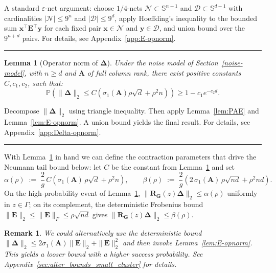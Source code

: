 \documentclass{article}
\newcommand{\twonorm}[1]{\|#1\|_2}
\newcommand{\pr}[1]{\mbox{}\mathbb{P}\left(#1\right)}
\newcommand{\ts}{\top}
\newcommand{\xb}{\mathbf{x}}
\newcommand{\yb}{\mathbf{y}}
\newcommand{\Ab}{\mathbf{A}}
\newcommand{\Eb}{\mathbf{E}}
\newcommand{\Gb}{\mathbf{G}}
\newcommand{\Rb}{\mathbf{R}}
\newcommand{\Dcal}{\mathcal{D}}
\newcommand{\Ncal}{\mathcal{N}}
\newcommand{\BlackBox}{\rule{1.5ex}{1.5ex}}  %
\newenvironment{proof}{\par\noindent{\bf Proof\ }}{\hfill\BlackBox\par\medskip}
\newtheorem{lemma}{Lemma}[section]
\newtheorem{remark}[theorem]{Remark}
\newcommand{\rbr}[1]{\left(#1\right)}
\newcommand{\Deltab}{\boldsymbol{\Delta}}
\begin{document}
\begin{proof}
    A standard $\varepsilon$-net argument: choose $1/4$-nets $\Ncal \subset \mathbb{S}^{n-1}$ and $\Dcal \subset \mathbb{S}^{d-1}$ with cardinalities $|\Ncal|\le 9^n$ and $|\Dcal|\le 9^d$, apply Hoeffding's inequality to the bounded sum $\xb^\ts \Eb^\ts \yb$ for each fixed pair $\xb\in \Ncal$ and $\yb\in \Dcal$, and union bound over the $9^{n+d}$ pairs. 
   For details, see Appendix~\ref{app:E-opnorm}.
\end{proof}

\begin{lemma}[Operator norm of $\Deltab$]\label{lem:Delta-opnorm}
Under the noise model of Section~\ref{noise-model}, with $n \ge d$ and $\Ab$ of full column rank, there exist positive constants $C, c_1, c_2$, such that:
\begin{equation*}
    \pr{\twonorm{\Deltab} \le C (\sigma_1(\Ab) \rho \sqrt{d} + \rho^2 n)} \ge 1 - c_1 e^{-c_2 d}.
\end{equation*}
\end{lemma}

\begin{proof}
Decompose $\twonorm{\Deltab}$ using triangle inequality. Then apply Lemma~\ref{lem:PAE} and Lemma~\ref{lem:E-opnorm}. A union bound yields the final result. For details, see Appendix~\ref{app:Delta-opnorm}.
\end{proof}

With Lemma~\ref{lem:Delta-opnorm} in hand we can define the contraction parameters that drive the Neumann tail bound below: let $C$ be the constant from Lemma~\ref{lem:Delta-opnorm} and set
\begin{equation}\label{eq:alpha-beta}
    \alpha(\rho) \;:=\; \frac{2}{g}\,C\rbr{\sigma_1(\Ab)\,\rho\sqrt{d} + \rho^2 n},
    \qquad
    \beta(\rho) \;:=\; \frac{2}{g}\rbr{2\,\sigma_1(\Ab)\,\rho\sqrt{nd} + \rho^2 nd}.
\end{equation}
On the high-probability event of Lemma~\ref{lem:Delta-opnorm}, $\twonorm{\Rb_\Gb(z)\Deltab} \le \alpha(\rho)$ uniformly in $z\in\Gamma$; on its complement, the deterministic Frobenius bound $\twonorm{\Eb}\le\|\Eb\|_F\le\rho\sqrt{nd}$ gives $\twonorm{\Rb_\Gb(z)\Deltab}\le\beta(\rho)$.

\begin{remark}
    We could alternatively use the deterministic bound $\twonorm{\Deltab} \le 2 \sigma_1(\Ab) \twonorm{\Eb} + \twonorm{\Eb}^2$ and then invoke Lemma~\ref{lem:E-opnorm}. This yields a looser bound with a higher success probability. See Appendix~\ref{sec:alter_bounds_small_cluster} for details.
\end{remark}
\end{document}
